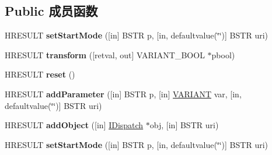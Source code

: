 \subsection*{Public 成员函数}
\begin{DoxyCompactItemize}
\item 
\mbox{\label{interface_m_s_x_m_l2_1_1_i_x_s_l_processor_a44ba8202ebbf945bc508f9f71697be7d}} 
H\+R\+E\+S\+U\+LT {\bfseries set\+Start\+Mode} (\mbox{[}in\mbox{]} B\+S\+TR p, \mbox{[}in, defaultvalue(\char`\"{}\char`\"{})\mbox{]} B\+S\+TR uri)
\item 
\mbox{\label{interface_m_s_x_m_l2_1_1_i_x_s_l_processor_acfb60471c931018529e7f178850fb673}} 
H\+R\+E\+S\+U\+LT {\bfseries transform} (\mbox{[}retval, out\mbox{]} V\+A\+R\+I\+A\+N\+T\+\_\+\+B\+O\+OL $\ast$pbool)
\item 
\mbox{\label{interface_m_s_x_m_l2_1_1_i_x_s_l_processor_a501afc385ac4ef4db427904db8bb861b}} 
H\+R\+E\+S\+U\+LT {\bfseries reset} ()
\item 
\mbox{\label{interface_m_s_x_m_l2_1_1_i_x_s_l_processor_a5ad9e9ace775c372867e3938a93a06b6}} 
H\+R\+E\+S\+U\+LT {\bfseries add\+Parameter} (\mbox{[}in\mbox{]} B\+S\+TR p, \mbox{[}in\mbox{]} \hyperlink{structtag_v_a_r_i_a_n_t}{V\+A\+R\+I\+A\+NT} var, \mbox{[}in, defaultvalue(\char`\"{}\char`\"{})\mbox{]} B\+S\+TR uri)
\item 
\mbox{\label{interface_m_s_x_m_l2_1_1_i_x_s_l_processor_a8fb859ac26ce214368826b25bbe93def}} 
H\+R\+E\+S\+U\+LT {\bfseries add\+Object} (\mbox{[}in\mbox{]} \hyperlink{interface_i_dispatch}{I\+Dispatch} $\ast$obj, \mbox{[}in\mbox{]} B\+S\+TR uri)
\item 
\mbox{\label{interface_m_s_x_m_l2_1_1_i_x_s_l_processor_a44ba8202ebbf945bc508f9f71697be7d}} 
H\+R\+E\+S\+U\+LT {\bfseries set\+Start\+Mode} (\mbox{[}in\mbox{]} B\+S\+TR p, \mbox{[}in, defaultvalue(\char`\"{}\char`\"{})\mbox{]} B\+S\+TR uri)
\item 
\mbox{\label{interface_m_s_x_m_l2_1_1_i_x_s_l_processor_acfb60471c931018529e7f178850fb673}} 

\end{DoxyCompactItemize}
